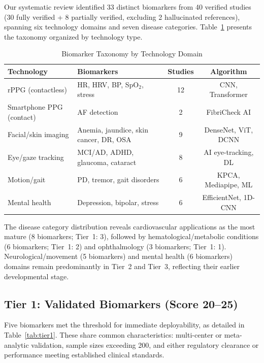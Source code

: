 \documentclass[conference]{IEEEtran}
\begin{document}
Our systematic review identified 33 distinct biomarkers from 40 verified studies (30 fully verified + 8 partially verified, excluding 2 hallucinated references), spanning six technology domains and seven disease categories. Table~\ref{tab:taxonomy} presents the taxonomy organized by technology type.

\begin{table}[t]
\caption{Biomarker Taxonomy by Technology Domain}
\label{tab:taxonomy}
\centering
\small
\begin{tabular}{p{2.2cm}p{2.8cm}cc}
\toprule
\textbf{Technology} & \textbf{Biomarkers} & \textbf{Studies} & \textbf{Algorithm} \\
\midrule
rPPG (contactless) & HR, HRV, BP, SpO$_2$, stress & 12 & CNN, Transformer \\
Smartphone PPG (contact) & AF detection & 2 & FibriCheck AI \\
Facial/skin imaging & Anemia, jaundice, skin cancer, DR, OSA & 9 & DenseNet, ViT, DCNN \\
Eye/gaze tracking & MCI/AD, ADHD, glaucoma, cataract & 8 & AI eye-tracking, DL \\
Motion/gait & PD, tremor, gait disorders & 6 & KPCA, Mediapipe, ML \\
Mental health & Depression, bipolar, stress & 6 & EfficientNet, 1D-CNN \\
\bottomrule
\end{tabular}
\end{table}

The disease category distribution reveals cardiovascular applications as the most mature (8 biomarkers; Tier~1: 3), followed by hematological/metabolic conditions (6 biomarkers; Tier~1: 2) and ophthalmology (3 biomarkers; Tier~1: 1). Neurological/movement (5 biomarkers) and mental health (6 biomarkers) domains remain predominantly in Tier~2 and Tier~3, reflecting their earlier developmental stage.

\subsection{Tier 1: Validated Biomarkers (Score 20--25)}

Five biomarkers met the threshold for immediate deployability, as detailed in Table~\ref{tab:tier1}. These share common characteristics: multi-center or meta-analytic validation, sample sizes exceeding 200, and either regulatory clearance or performance meeting established clinical standards.
\end{document}

